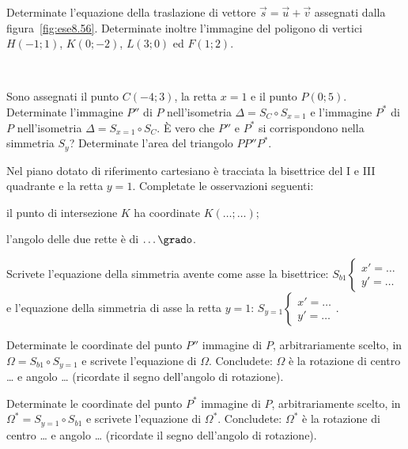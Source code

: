 \begin{esercizio}
  \label{ese:8.56} %
  Determinate l'equazione della traslazione di vettore 
  $\vec{s}=\vec{u}+\vec{v}$ assegnati dalla figura~\ref{fig:ese8.56}. 
  Determinate inoltre l'immagine del poligono di vertici $H(-1;1)$, 
  $K(0;-2)$, $L(3;0)$ ed $F(1;2)$.
\end{esercizio}


\begin{minipage}{0.25\textwidth}
  \centering~~
\end{minipage}\vspace{8pt}

\begin{esercizio}
  \label{ese:8.65} %
  Sono assegnati il punto $C(-4;3)$, la retta $x=1$ e il punto 
  $P(0;5)$. Determinate l'immagine $P''$ di $P$ nell'isometria 
  $\Delta=S_{C}\circ S_{x=1}$ e l'immagine $P^*$ di $P$ nell'isometria 
  $\Delta=S_{x=1}\circ S_{C}$. \`E vero che $P''$ e $P^*$ si 
  corrispondono nella simmetria $S_y$? Determinate l'area del triangolo 
  $PP''P^*$.
\end{esercizio}

\begin{esercizio}
  \label{ese:8.69} %
  Nel piano dotato di riferimento cartesiano è tracciata la bisettrice 
  del I e III quadrante e la 
  retta $y=1$. Completate le osservazioni seguenti:
  \begin{enumeratea}
    \item il punto di intersezione $K$ ha coordinate 
    $K(\ldots{};\ldots{})$;
    \item l'angolo delle due rette è di $\ldots{}\grado$.
  \end{enumeratea}
  Scrivete l'equazione della simmetria avente come asse la bisettrice: 
  $S_{b1}\begin{cases}x'=\ldots{}\\y'=\ldots{}\end{cases}$ e 
  l'equazione della simmetria di asse la retta $y=1$: 
  $S_{y=1}\begin{cases}x'=\ldots{}\\y'=\ldots{}\end{cases}$.

  Determinate le coordinate del punto $P''$ immagine di $P$, 
  arbitrariamente scelto, in $\Omega = S_{b1} \circ S_{y=1}$ e scrivete 
  l'equazione di $\Omega$.
  Concludete: $\Omega$ è la rotazione di centro \ldots{} e angolo 
  \ldots{} (ricordate il segno dell'angolo di rotazione).

  Determinate le coordinate del punto $P^*$ immagine di $P$, 
  arbitrariamente scelto, in $\Omega^*=S_{y=1} \circ S_{b1}$ e scrivete 
  l'equazione di $\Omega^*$.
  Concludete: $\Omega^*$ è la rotazione di centro \ldots{} e angolo 
  \ldots{} (ricordate il segno dell'angolo di rotazione).
\end{esercizio}

